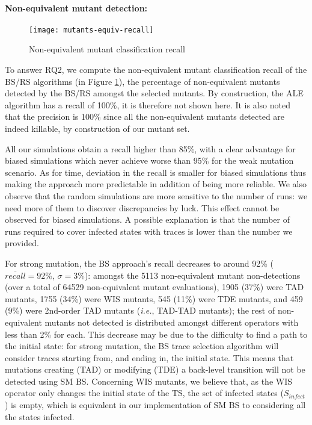 \paragraph{Non-equivalent mutant detection:}

\begin{figure}
	\centering
	\texttt{[image: mutants-equiv-recall]}
	\caption{Non-equivalent mutant classification recall}
	\label{fig:assessment:mutantsequivrecall}
\end{figure}

To answer RQ2, we compute the non-equi\-va\-lent mutant classification recall of the BS/RS algorithms (in Figure \ref{fig:assessment:mutantsequivrecall}), \ie the percentage of non-equi\-va\-lent mutants detected by the BS/RS amongst the selected mutants. By construction, the ALE algorithm has a recall of 100\%, it is therefore not shown here. It is also noted that the precision is 100\% since all the non-equivalent mutants detected are indeed killable, by construction of our mutant set. 

All our simulations obtain a recall higher than 85\%, with a clear advantage for biased simulations which  never achieve worse than  95\% for the weak mutation scenario.  As for time, deviation in the recall is smaller for biased simulations thus making the approach more predictable in addition of being more reliable. We also observe that the random simulations are more sensitive to the number of runs: we need more of them to discover discrepancies by luck. This effect cannot be observed for biased simulations. A possible explanation is that the number of runs required to cover infected states with traces is lower than the number we provided.  

For strong mutation, the BS approach's recall decreases to around 92\% ($\overline{recall}=92$\%, $\sigma=3$\%): amongst the 5113  non-equi\-va\-lent mutant non-detections (over a total of 64529 non-equi\-va\-lent mutant evaluations), 1905 (37\%) were TAD mutants, 1755 (34\%) were WIS mutants, 545 (11\%) were TDE mutants, and 459 (9\%) were 2nd-order TAD mutants (\textit{i.e.}, TAD-TAD mutants); the rest of non-equi\-va\-lent mutants not detected is distributed amongst different operators with less than 2\% for each. This decrease may be due to the difficulty to find a path to the initial state: for strong mutation, the BS trace selection algorithm will consider traces starting from, and ending in, the initial state. This means that mutations creating (TAD) or modifying (TDE) a back-level transition will not be detected using SM BS. Concerning WIS mutants, we believe that, as the WIS operator only changes the initial state of the TS, the set of infected states ($S_{infect}$) is empty, which is equivalent in our implementation of SM BS to considering all the states infected.

